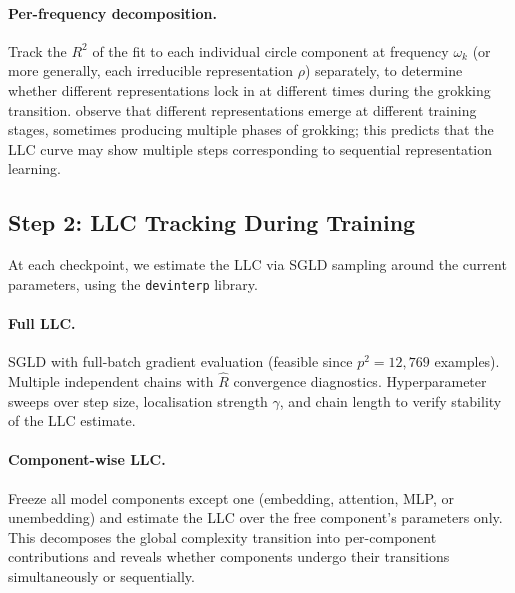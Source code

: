 \documentclass[11pt,a4paper]{article}
\begin{document}
\paragraph{Per-frequency decomposition.} Track the $R^2$ of the fit to each individual circle component at frequency $\omega_k$ (or more generally, each irreducible representation $\rho$) separately, to determine whether different representations lock in at different times during the grokking transition. \citet{chughtai2023toy} observe that different representations emerge at different training stages, sometimes producing multiple phases of grokking; this predicts that the LLC curve may show multiple steps corresponding to sequential representation learning.

\subsection{Step 2: LLC Tracking During Training}\label{sec:llc}

At each checkpoint, we estimate the LLC via SGLD sampling around the current parameters, using the \texttt{devinterp} library.

\paragraph{Full LLC.} SGLD with full-batch gradient evaluation (feasible since $p^2 = 12{,}769$ examples). Multiple independent chains with $\hat{R}$ convergence diagnostics. Hyperparameter sweeps over step size, localisation strength $\gamma$, and chain length to verify stability of the LLC estimate.

\paragraph{Component-wise LLC.} Freeze all model components except one (embedding, attention, MLP, or unembedding) and estimate the LLC over the free component's parameters only. This decomposes the global complexity transition into per-component contributions and reveals whether components undergo their transitions simultaneously or sequentially.
\end{document}
